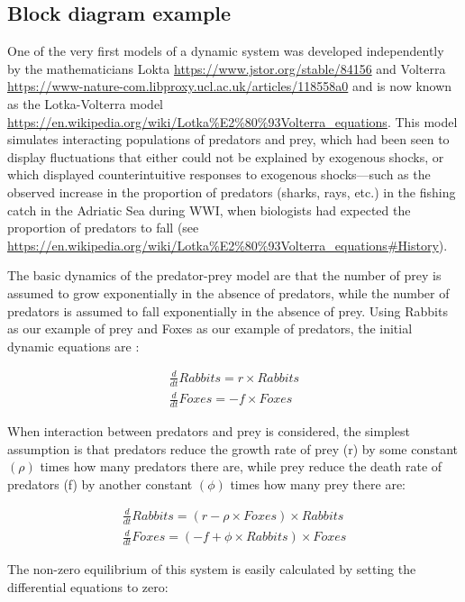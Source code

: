 \subsection{Block diagram example}

One of the very first models of a dynamic system was developed independently
by the mathematicians Lokta \url{https://www.jstor.org/stable/84156}
and Volterra \url{https://www-nature-com.libproxy.ucl.ac.uk/articles/118558a0}
and is now known as the Lotka-Volterra model \url{https://en.wikipedia.org/wiki/Lotka%E2%80%93Volterra_equations}.
This model simulates interacting populations of predators and prey,
which had been seen to display fluctuations that either could not
be explained by exogenous shocks, or which displayed counterintuitive
responses to exogenous shocks---such as the observed increase in
the proportion of predators (sharks, rays, etc.) in the fishing catch
in the Adriatic Sea during WWI, when biologists had expected the proportion
of predators to fall (see \url{https://en.wikipedia.org/wiki/Lotka%E2%80%93Volterra_equations#History}).

The basic dynamics of the predator-prey model are that the number
of prey is assumed to grow exponentially in the absence of predators,
while the number of predators is assumed to fall exponentially in
the absence of prey. Using Rabbits as our example of prey and Foxes
as our example of predators, the initial dynamic equations are :

\[
\begin{array}{c}
\frac{d}{dt}Rabbits=r\times Rabbits\\
\frac{d}{dt}Foxes=-f\times Foxes
\end{array}
\]

When interaction between predators and prey is considered, the simplest
assumption is that predators reduce the growth rate of prey (r) by
some constant $\left(\rho\right)$ times how many predators there
are, while prey reduce the death rate of predators (f) by another
constant $\left(\phi\right)$ times how many prey there are:

\[
\begin{array}{c}
\frac{d}{dt}Rabbits=\left(r-\rho\times Foxes\right)\times Rabbits\\
\frac{d}{dt}Foxes=\left(-f+\phi\times Rabbits\right)\times Foxes
\end{array}
\]

The non-zero equilibrium of this system is easily calculated by setting
the differential equations to zero:

